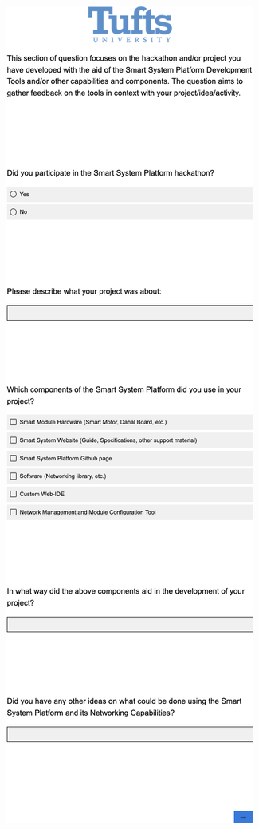\begin{multicols}{2}
\includegraphics[width=.75\linewidth]{overleaf/images/q6.png}

\end{multicols}
